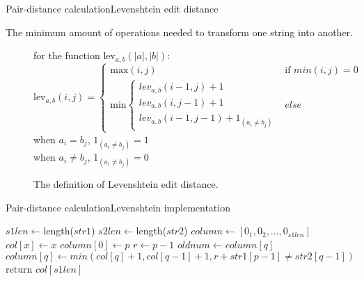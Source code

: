 \documentclass[t]{beamer}
\begin{document}
  \begin{frame}{Pair-distance calculation}{Levenshtein edit distance}
	
	The minimum amount of operations needed to transform one string into another.

    \begin{figure}
      \vspace{5mm}
      \centering
      for the function $\mbox{lev}_{a,b}(|a|,|b|)$:\\
      $$\mbox{lev}_{a,b}(i,j) = 
      \left\{
      \begin{array}{ll}
        \mbox{max}(i,j) & \mbox{if }min(i,j) = 0\\
        \mbox{min}\left\{
        \begin{array}{lll}
          lev_{a,b}(i-1,j)+1\\
          lev_{a,b}(i,j-1)+1\\
          lev_{a,b}(i-1,j-1)+1_{(a_i{\neq}b_j)}
        \end{array}
        \right.
        & else 
      \end{array}
      \right.$$
      when $a_i = b_j$, $1_{(a_i{\neq}b_j)} = 1$\\
      when  $a_i \neq b_j$, $1_{(a_i{\neq}b_j)} = 0$
      \caption{The definition of Levenshtein edit distance.}
      \label{fig:levdef}
    \end{figure}

  \end{frame}

  \begin{frame}{Pair-distance calculation}{Levenshtein implementation}
 \begin{algorithmic}
    \State $s1len \gets $length($str1$)
    \State $s2len \gets $length($str2$)
    \State $column \gets [0_{1}, 0_{2}, \ldots, 0_{s1len}]$
    \State $col[x] \gets x$
    \EndFor
    \State $column[0] \gets p$
    \State $r \gets p-1$
    \State $oldnum \gets column[q]$
    \State $column[q] \gets min(col[q]+1, col[q-1] + 1, r + str1[p-1] \neq str2[q-1])$
    \EndFor
    \EndFor
    \State return $col[s1len]$
    \EndFunction
  \end{algorithmic}
\end{frame}
\end{document}
